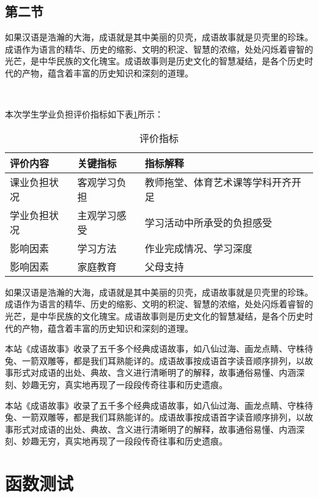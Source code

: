 \documentclass[hyperref, a4paper, UTF8, zihao = -4, linespread = 1]{ctexbook}
\begin{document}
\hypertarget{ux7b2cux4e8cux8282}{%
\section{第二节}\label{ux7b2cux4e8cux8282}}

如果汉语是浩瀚的大海，成语就是其中美丽的贝壳，成语故事就是贝壳里的珍珠。成语作为语言的精华、历史的缩影、文明的积淀、智慧的浓缩，处处闪烁着睿智的光芒，是中华民族的文化瑰宝。成语故事则是历史文化的智慧凝结，是各个历史时代的产物，蕴含着丰富的历史知识和深刻的道理。

　　

本次学生学业负担评价指标如下表\ref{tab:zb}所示：

\begin{table}

\caption{\label{tab:zb}评价指标}
\centering
\begin{tabular}[t]{lll}
\toprule
评价内容 & 关键指标 & 指标解释\\
\midrule
课业负担状况 & 客观学习负担 & 教师拖堂、体育艺术课等学科开齐开足\\
学业负担状况 & 主观学习感受 & 学习活动中所承受的负担感受\\
影响因素 & 学习方法 & 作业完成情况、学习深度\\
影响因素 & 家庭教育 & 父母支持\\
\bottomrule
\end{tabular}
\end{table}

如果汉语是浩瀚的大海，成语就是其中美丽的贝壳，成语故事就是贝壳里的珍珠。成语作为语言的精华、历史的缩影、文明的积淀、智慧的浓缩，处处闪烁着睿智的光芒，是中华民族的文化瑰宝。成语故事则是历史文化的智慧凝结，是各个历史时代的产物，蕴含着丰富的历史知识和深刻的道理。

本站《成语故事》收录了五千多个经典成语故事，如八仙过海、画龙点睛、守株待兔、一箭双雕等，都是我们耳熟能详的。成语故事按成语首字读音顺序排列，以故事形式对成语的出处、典故、含义进行清晰明了的解释，故事通俗易懂、内涵深刻、妙趣无穷，真实地再现了一段段传奇往事和历史遗痕。

本站《成语故事》收录了五千多个经典成语故事，如八仙过海、画龙点睛、守株待兔、一箭双雕等，都是我们耳熟能详的。成语故事按成语首字读音顺序排列，以故事形式对成语的出处、典故、含义进行清晰明了的解释，故事通俗易懂、内涵深刻、妙趣无穷，真实地再现了一段段传奇往事和历史遗痕。

\hypertarget{test}{%
\chapter{函数测试}\label{test}}
\end{document}
